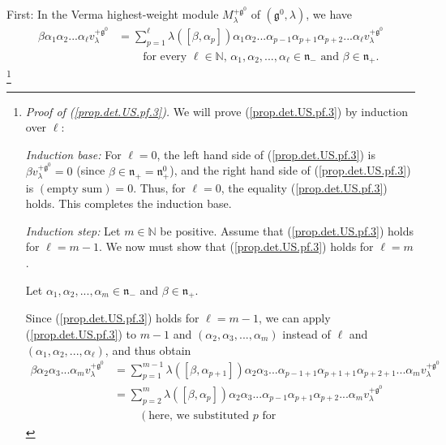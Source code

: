 \documentclass[etingof-lie.tex]{subfiles}
\begin{document}
First: In the Verma highest-weight module $M_{\lambda}^{+\mathfrak{g}^{0}}$ of
$\left(  \mathfrak{g}^{0},\lambda\right)  $, we have%
\begin{align}
\beta\alpha_{1}\alpha_{2}...\alpha_{\ell}v_{\lambda}^{+\mathfrak{g}^{0}}  &
=\sum\limits_{p=1}^{\ell}\lambda\left(  \left[  \beta,\alpha_{p}\right]
\right)  \alpha_{1}\alpha_{2}...\alpha_{p-1}\alpha_{p+1}\alpha_{p+2}%
...\alpha_{\ell}v_{\lambda}^{+\mathfrak{g}^{0}}\label{prop.det.US.pf.3}\\
&  \ \ \ \ \ \ \ \ \ \ \text{for every }\ell\in\mathbb{N}\text{, }\alpha
_{1},\alpha_{2},...,\alpha_{\ell}\in\mathfrak{n}_{-}\text{ and }\beta
\in\mathfrak{n}_{+}\text{.}\nonumber
\end{align}
\footnote{\textit{Proof of (\ref{prop.det.US.pf.3}).} We will prove
(\ref{prop.det.US.pf.3}) by induction over $\ell$:
\par
\textit{Induction base:} For $\ell=0$, the left hand side of
(\ref{prop.det.US.pf.3}) is $\beta v_{\lambda}^{+\mathfrak{g}^{0}}=0$ (since
$\beta\in\mathfrak{n}_{+}=\mathfrak{n}_{+}^{0}$), and the right hand side of
(\ref{prop.det.US.pf.3}) is $\left(  \text{empty sum}\right)  =0$. Thus, for
$\ell=0$, the equality (\ref{prop.det.US.pf.3}) holds. This completes the
induction base.
\par
\textit{Induction step:} Let $m\in\mathbb{N}$ be positive. Assume that
(\ref{prop.det.US.pf.3}) holds for $\ell=m-1$. We now must show that
(\ref{prop.det.US.pf.3}) holds for $\ell=m$.
\par
Let $\alpha_{1},\alpha_{2},...,\alpha_{m}\in\mathfrak{n}_{-}$ and $\beta
\in\mathfrak{n}_{+}$.
\par
Since (\ref{prop.det.US.pf.3}) holds for $\ell=m-1$, we can apply
(\ref{prop.det.US.pf.3}) to $m-1$ and $\left(  \alpha_{2},\alpha
_{3},...,\alpha_{m}\right)  $ instead of $\ell$ and $\left(  \alpha_{1}%
,\alpha_{2},...,\alpha_{\ell}\right)  $, and thus obtain%
\begin{align*}
\beta\alpha_{2}\alpha_{3}...\alpha_{m}v_{\lambda}^{+\mathfrak{g}^{0}}  &
=\sum\limits_{p=1}^{m-1}\lambda\left(  \left[  \beta,\alpha_{p+1}\right]
\right)  \alpha_{2}\alpha_{3}...\alpha_{p-1+1}\alpha_{p+1+1}\alpha
_{p+2+1}...\alpha_{m}v_{\lambda}^{+\mathfrak{g}^{0}}\\
&  =\sum\limits_{p=2}^{m}\lambda\left(  \left[  \beta,\alpha_{p}\right]
\right)  \alpha_{2}\alpha_{3}...\alpha_{p-1}\alpha_{p+1}\alpha_{p+2}%
...\alpha_{m}v_{\lambda}^{+\mathfrak{g}^{0}}\\
&  \ \ \ \ \ \ \ \ \ \ \left(  \text{here, we substituted }p\text{ for
}
\end{align*}}
\end{document}

